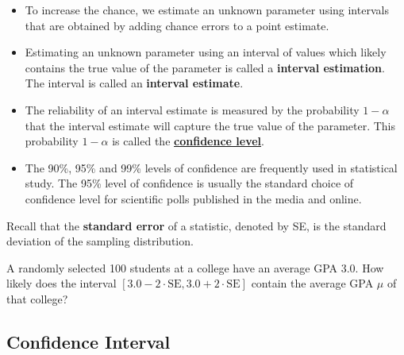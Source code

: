 \begin{itemize}
\item
  To increase the chance, we estimate an unknown parameter using
  intervals that are obtained by adding chance errors to a point
  estimate.
\item
  Estimating an unknown parameter using an interval of values which
  likely contains the true value of the parameter is called a
  \textbf{interval estimation}. The interval is called an
  \textbf{interval estimate}.
\item
  The reliability of an interval estimate is measured by the probability
  \(1-\alpha\) that the interval estimate will capture the true value of
  the parameter. This probability \(1-\alpha\) is called the
  \href{https://saylordotorg.github.io/text_introductory-statistics/s11-estimation.html}{\textbf{confidence
  level}}.
\item
  The 90\%, 95\% and 99\% levels of confidence are frequently used in
  statistical study. The 95\% level of confidence is usually the
  standard choice of confidence level for scientific polls published in
  the media and online.
\end{itemize}

\begin{example}

Recall that the \textbf{standard error} of a statistic, denoted by SE,
is the standard deviation of the sampling distribution.

A randomly selected 100 students at a college have an average GPA 3.0.
How likely does the interval
\([3.0-2\cdot\text{SE}, 3.0+2\cdot\text{SE}]\) contain the average GPA
\(\mu\) of that college?

\end{example}
\vspace*{6\baselineskip}


\hypertarget{confidence-interval}{%
\subsection{Confidence Interval}\label{confidence-interval}}


